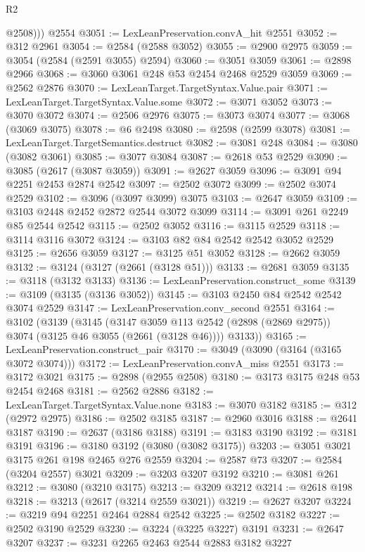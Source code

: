 \begin{lexlean}{R2}
\begin{coremodule}
          @2508)))
    @2554
@3051 := LexLeanPreservation.convA_hit @2551
@3052 := @312 @2961
@3054 := @2584 (@2588 @3052)
@3055 := @2900 @2975
@3059 := @3054 (@2584 (@2591 @3055) @2594)
@3060 := @3051 @3059
@3061 := @2898 @2966
@3068 := @3060 @3061 @248 @53 @2454 @2468 @2529 @3059
@3069 := @2562 @2876
@3070 := LexLeanTarget.TargetSyntax.Value.pair
@3071 := LexLeanTarget.TargetSyntax.Value.some
@3072 := @3071 @3052
@3073 := @3070 @3072
@3074 := @2506 @2976
@3075 := @3073 @3074
@3077 := @3068 (@3069 @3075)
@3078 := @6 @2498
@3080 := @2598 (@2599 @3078)
@3081 := LexLeanTarget.TargetSemantics.destruct
@3082 := @3081 @248
@3084 := @3080 (@3082 @3061)
@3085 := @3077 @3084
@3087 := @2618 @53 @2529
@3090 := @3085 (@2617 (@3087 @3059))
@3091 := @2627 @3059
@3096 := @3091 @94 @2251 @2453 @2874 @2542
@3097 := @2502 @3072
@3099 := @2502 @3074 @2529
@3102 := @3096 (@3097 @3099) @3075
@3103 := @2647 @3059
@3109 := @3103 @2448 @2452 @2872 @2544 @3072 @3099
@3114 := @3091 @261 @2249 @85 @2544 @2542
@3115 := @2502 @3052
@3116 := @3115 @2529
@3118 := @3114 @3116 @3072
@3124 := @3103 @82 @84 @2542 @2542 @3052 @2529
@3125 := @2656 @3059
@3127 := @3125 @51 @3052
@3128 := @2662 @3059
@3132 := @3124 (@3127 (@2661 (@3128 @51)))
@3133 := @2681 @3059
@3135 := @3118 (@3132 @3133)
@3136 := LexLeanPreservation.construct_some
@3139 := @3109 (@3135 (@3136 @3052))
@3145 := @3103 @2450 @84 @2542 @2542 @3074 @2529
@3147 := LexLeanPreservation.conv_second @2551
@3164 := @3102
    (@3139
      (@3145
        (@3147 @3059 @113 @2542 (@2898 (@2869 @2975)) @3074 (@3125 @46 @3055 (@2661 (@3128 @46))))
        @3133))
@3165 := LexLeanPreservation.construct_pair
@3170 := @3049 (@3090 (@3164 (@3165 @3072 @3074)))
@3172 := LexLeanPreservation.convA_miss @2551
@3173 := @3172 @3021
@3175 := @2898 (@2955 @2508)
@3180 := @3173 @3175 @248 @53 @2454 @2468
@3181 := @2562 @2886
@3182 := LexLeanTarget.TargetSyntax.Value.none
@3183 := @3070 @3182
@3185 := @312 (@2972 @2975)
@3186 := @2502 @3185
@3187 := @2960 @3016
@3188 := @2641 @3187
@3190 := @2637 (@3186 @3188)
@3191 := @3183 @3190
@3192 := @3181 @3191
@3196 := @3180 @3192 (@3080 (@3082 @3175))
@3203 := @3051 @3021 @3175 @261 @198 @2465 @276 @2559
@3204 := @2587 @73
@3207 := @2584 (@3204 @2557) @3021
@3209 := @3203 @3207 @3192
@3210 := @3081 @261
@3212 := @3080 (@3210 @3175)
@3213 := @3209 @3212
@3214 := @2618 @198
@3218 := @3213 (@2617 (@3214 @2559 @3021))
@3219 := @2627 @3207
@3224 := @3219 @94 @2251 @2464 @2884 @2542
@3225 := @2502 @3182
@3227 := @2502 @3190 @2529
@3230 := @3224 (@3225 @3227) @3191
@3231 := @2647 @3207
@3237 := @3231 @2265 @2463 @2544 @2883 @3182 @3227

\end{coremodule}
\end{lexlean}

